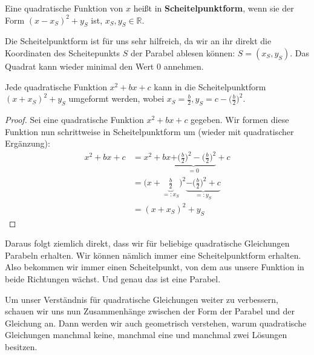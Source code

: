 \documentclass[../../main.tex]{subfiles}
\begin{document}
\begin{definition}
Eine quadratische Funktion von $x$ heißt in \textbf{Scheitelpunktform}, wenn sie der Form $(x-x_S)^2+y_S$ ist, $x_S,y_S\in\mathbb{R}$.
\end{definition}
Die Scheitelpunktform ist für uns sehr hilfreich, da wir an ihr direkt die Koordinaten des Scheitepunkts $S$ der Parabel ablesen können: $S=(x_S,y_S)$. Das Quadrat kann wieder minimal den Wert 0 annehmen.
\begin{theorem}
Jede quadratische Funktion $x^2+bx+c$ kann in die Scheitelpunktform $(x+x_S)^2+y_S$ umgeformt werden, wobei $x_S=\frac{b}{2}, y_S=c-\Big(\frac{b}{2}\Big)^2$.
\end{theorem}
\begin{proof}
Sei eine quadratische Funktion $x^2+bx+c$ gegeben. Wir formen diese Funktion nun schrittweise in Scheitelpunktform um (wieder mit quadratischer Ergänzung):
\begin{equation*}\begin{split}
    x^2+bx+c&=x^2+bx\underbrace{+\Big(\frac{b}{2}\Big)^2-\Big(\frac{b}{2}\Big)^2}_{=0}+c\\
    &=\Big(x+\underbrace{\frac{b}{2}}_{=:x_S}\Big)^2\underbrace{-\Big(\frac{b}{2}\Big)^2+c}_{=:y_S}\\
    &=(x+x_S)^2+y_S
\end{split}\end{equation*}
\end{proof}
Daraus folgt ziemlich direkt, dass wir für beliebige quadratische Gleichungen Parabeln erhalten. Wir können nämlich immer eine Scheitelpunktform erhalten. Also bekommen wir immer einen Scheitelpunkt, von dem aus unsere Funktion in beide Richtungen wächst. Und genau das ist eine Parabel.

Um unser Verständnis für quadratische Gleichungen weiter zu verbessern, schauen wir uns nun Zusammenhänge zwischen der Form der Parabel und der Gleichung an. Dann werden wir auch geometrisch verstehen, warum quadratische Gleichungen manchmal keine, manchmal eine und manchmal zwei Lösungen besitzen.
\end{document}
